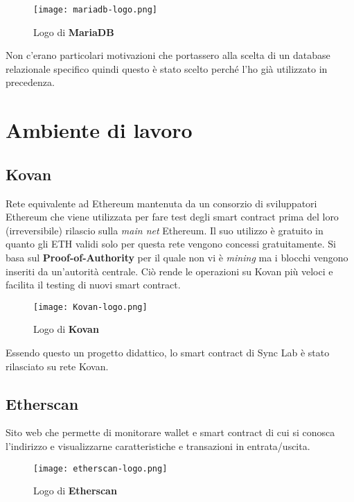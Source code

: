     \begin{figure}[h!]
        \centering
        \texttt{[image: mariadb-logo.png]}
        \caption{Logo di \textbf{MariaDB}}
    \end{figure}

    Non c'erano particolari motivazioni che portassero alla scelta di un database relazionale specifico quindi questo è stato scelto perché l'ho già utilizzato in precedenza.

\section{Ambiente di lavoro}
    \subsection{Kovan}
    Rete equivalente ad Ethereum mantenuta da un consorzio di sviluppatori Ethereum che viene utilizzata per fare test degli smart contract prima del loro (irreversibile) rilascio sulla \textit{main net} Ethereum. Il suo utilizzo è gratuito in quanto gli ETH validi solo per questa rete vengono concessi gratuitamente. Si basa sul \textbf{Proof-of-Authority} per il quale non vi è \textit{mining} ma i blocchi vengono inseriti da un'autorità centrale. Ciò rende le operazioni su Kovan più veloci e facilita il testing di nuovi smart contract.

    \begin{figure}[h!]
        \centering
        \texttt{[image: Kovan-logo.png]}
        \caption{Logo di \textbf{Kovan}}
    \end{figure}

    Essendo questo un progetto didattico, lo smart contract di Sync Lab è stato rilasciato su rete Kovan.

    \subsection{Etherscan}
    Sito web che permette di monitorare wallet e smart contract di cui si conosca l'indirizzo e visualizzarne caratteristiche e transazioni in entrata/uscita.

    \begin{figure}[h!]
        \centering
        \texttt{[image: etherscan-logo.png]}
        \caption{Logo di \textbf{Etherscan}}
    \end{figure}

